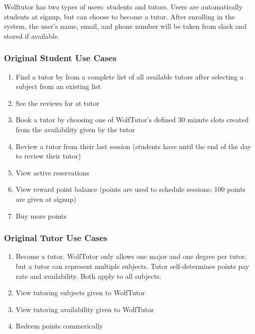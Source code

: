 Wolftutor has two types of users: students and tutors. Users are automatically students at signup, but can choose to become a tutor.
After enrolling in the system, the user's name, email, and phone number will be taken from slack and stored if available.

\subsubsection{Original Student Use Cases}
\label{sec:student-use-cases}

\begin{enumerate}
  \item Find a tutor by from a complete list of all available tutors after selecting a subject from an existing list
  \item See the reviews for at tutor
  \item Book a tutor by choosing one of WolfTutor's defined 30 minute slots created from the availability given by the tutor
  \item Review a tutor from their last session (students have until the end of the day to review their tutor)
  \item View active reservations
  \item View reward point balance (points are used to schedule sessions; 100 points are given at signup)
  \item Buy more points
\end{enumerate}

\subsubsection{Original Tutor Use Cases}
\label{sec:tutor-use-cases}

\begin{enumerate}
  \item Become a tutor. WolfTutor only allows one major and one degree per tutor, but a tutor can represent multiple subjects. Tutor self-determines points pay rate and availability. Both apply to all subjects.
  \item View tutoring subjects given to WolfTutor
  \item View tutoring availability given to WolfTutor
  \item Redeem points commerically
\end{enumerate}
